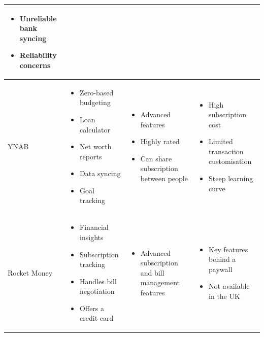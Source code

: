\documentclass{l4proj}
\begin{document}
\begin{table}[H]
\begin{tabular}{|p{3cm}|p{3.5cm}|p{3.5cm}|p{3.5cm}|}
\begin{itemize}[noitemsep, topsep=0pt, leftmargin=*]
            \item Unreliable bank syncing
            \item Reliability concerns
        \end{itemize} \\
        \hline
        YNAB &
        \begin{itemize}[noitemsep, topsep=0pt, leftmargin=*]
            \item Zero-based budgeting
            \item Loan calculator
            \item Net worth reports
            \item Data syncing
            \item Goal tracking
        \end{itemize} &
        \begin{itemize}[noitemsep, topsep=0pt, leftmargin=*]
            \item Advanced features
            \item Highly rated
            \item Can share subscription between people
        \end{itemize} &
        \begin{itemize}[noitemsep, topsep=0pt, leftmargin=*]
            \item High subscription cost
            \item Limited transaction customisation
            \item Steep learning curve
        \end{itemize} \\
        \hline
        Rocket Money &
        \begin{itemize}[noitemsep, topsep=0pt, leftmargin=*]
            \item Financial insights
            \item Subscription tracking
            \item Handles bill negotiation
            \item Offers a credit card
        \end{itemize} &
        \begin{itemize}[noitemsep, topsep=0pt, leftmargin=*]
            \item Advanced subscription and bill management features
        \end{itemize} &
        \begin{itemize}[noitemsep, topsep=0pt, leftmargin=*]
            \item Key features behind a paywall
            \item Not available in the UK
        \end{itemize} \\
        \hline
    \end{tabular}
\end{table}
\end{document}
